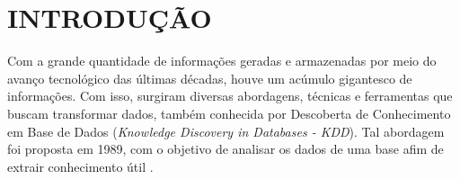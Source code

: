 \documentclass[
	12pt,				%
	openright,			%
	oneside,	
	a4paper,				%
	english,				%
	brazil				%
]{abntex2/abntex2} %
\begin{document}
\listoffigures*
\cleardoublepage

\listoftables*
\cleardoublepage

\listofquadros*
\cleardoublepage

\tableofcontents*
\cleardoublepage

\textual

\chapter{INTRODUÇÃO}
	Com a grande quantidade de informações geradas e armazenadas por meio do avanço tecnológico das últimas décadas, houve um acúmulo gigantesco de informações. Com isso, surgiram diversas abordagens, técnicas e ferramentas que buscam transformar dados, também conhecida por Descoberta de Conhecimento em Base de Dados (\textit{Knowledge Discovery in Databases - KDD}). Tal abordagem foi proposta em 1989, com o objetivo de analisar os dados de uma base afim de extrair conhecimento útil \cite{fayyad:1996}.	
	
\end{document}
